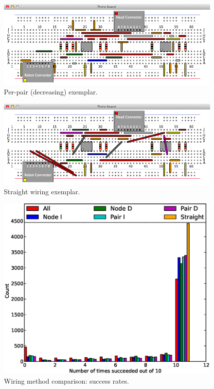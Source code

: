 \begin{figure}[H]
\begin{center}
\includegraphics[width=\textwidth]{Images/exemplar_per_pair_decreasing.png}
\caption{Per-pair (decreasing) exemplar.}
\end{center}
\end{figure}

\begin{figure}[H]
\begin{center}
\includegraphics[width=\textwidth]{Images/exemplar_straight_wiring.png}
\caption{Straight wiring exemplar.}
\end{center}
\end{figure}

\begin{figure}[H]
\begin{center}
\includegraphics[width=\textwidth]{Images/wiring_success_comparison.eps}
\caption{Wiring method comparison: success rates.}
\label{fig:wiring_success}
\end{center}
\end{figure}

